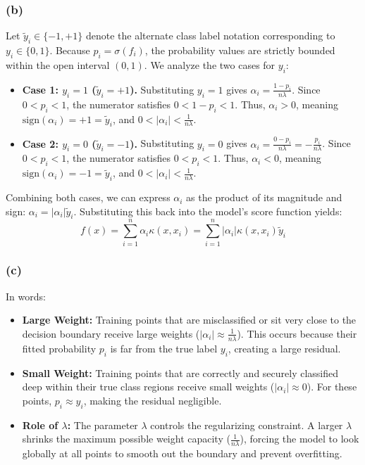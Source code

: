 \documentclass{article}
\begin{document}
\subsubsection*{(b)}
Let $\tilde{y}_i \in \{-1, +1\}$ denote the alternate class label notation corresponding to $y_i \in \{0, 1\}$. Because $p_i = \sigma(f_i)$, the probability values are strictly bounded within the open interval $(0, 1)$. We analyze the two cases for $y_i$:
\begin{itemize}
    \item \textbf{Case 1: $y_i = 1$ ($\tilde{y}_i = +1$).} Substituting $y_i = 1$ gives $\alpha_i = \frac{1 - p_i}{n\lambda}$. Since $0 < p_i < 1$, the numerator satisfies $0 < 1 - p_i < 1$. Thus, $\alpha_i > 0$, meaning $\text{sign}(\alpha_i) = +1 = \tilde{y}_i$, and $0 < |\alpha_i| < \frac{1}{n\lambda}$.
    \item \textbf{Case 2: $y_i = 0$ ($\tilde{y}_i = -1$).} Substituting $y_i = 0$ gives $\alpha_i = \frac{0 - p_i}{n\lambda} = -\frac{p_i}{n\lambda}$. Since $0 < p_i < 1$, the numerator satisfies $0 < p_i < 1$. Thus, $\alpha_i < 0$, meaning $\text{sign}(\alpha_i) = -1 = \tilde{y}_i$, and $0 < |\alpha_i| < \frac{1}{n\lambda}$.
\end{itemize}
Combining both cases, we can express $\alpha_i$ as the product of its magnitude and sign: $\alpha_i = |\alpha_i|\tilde{y}_i$. Substituting this back into the model's score function yields:
\begin{equation*}
f(x) = \sum_{i=1}^n \alpha_i \kappa(x, x_i) = \sum_{i=1}^n |\alpha_i| \kappa(x, x_i) \tilde{y}_i
\end{equation*}

\subsubsection*{(c)}
In words:
\begin{itemize}
    \item \textbf{Large Weight:} Training points that are misclassified or sit very close to the decision boundary receive large weights ($|\alpha_i| \approx \frac{1}{n\lambda}$). This occurs because their fitted probability $p_i$ is far from the true label $y_i$, creating a large residual.
    \item \textbf{Small Weight:} Training points that are correctly and securely classified deep within their true class regions receive small weights ($|\alpha_i| \approx 0$). For these points, $p_i \approx y_i$, making the residual negligible.
    \item \textbf{Role of $\lambda$:} The parameter $\lambda$ controls the regularizing constraint. A larger $\lambda$ shrinks the maximum possible weight capacity ($\frac{1}{n\lambda}$), forcing the model to look globally at all points to smooth out the boundary and prevent overfitting.
\end{itemize}
\end{document}
